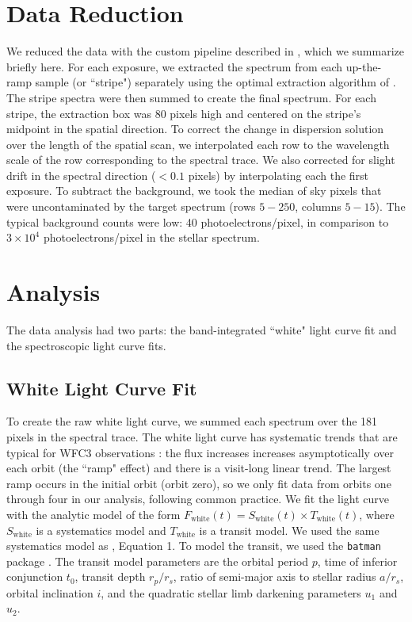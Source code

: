 \documentclass[twocolumn]{aastex61}
\begin{document}
\section{Data Reduction}
We reduced the data with the custom pipeline described in \cite{kreidberg14a}, which we summarize briefly here. For each exposure, we extracted the spectrum from each up-the-ramp sample (or ``stripe") separately using the optimal extraction algorithm of \citep{horne86}. The stripe spectra were then summed to create the final spectrum. For each stripe, the extraction box was 80 pixels high and centered on the stripe's midpoint in the spatial direction. To correct the change in dispersion solution over the length of the spatial scan, we interpolated each row to the wavelength scale of the row corresponding to the spectral trace. We also corrected for slight drift in the spectral direction ($<0.1$ pixels) by interpolating each the first exposure.  To subtract the background, we took the median of sky pixels that were uncontaminated by the target spectrum (rows $5-250$, columns $5-15$). The typical background counts were low: 40 photoelectrons/pixel, in comparison to $3\times10^4$ photoelectrons/pixel in the stellar spectrum.

\section{Analysis}
The data analysis had two parts: the band-integrated ``white" light curve fit and the spectroscopic light curve fits.

\subsection{White Light Curve Fit}
To create the raw white light curve, we summed each spectrum over the 181 pixels in the spectral trace.  The white light curve has systematic trends that are typical for WFC3 observations \cite{zhou17}: the flux increases increases asymptotically over each orbit (the ``ramp" effect) and there is a visit-long linear trend. The largest ramp occurs in the initial orbit (orbit zero), so we only fit data from orbits one through four in our analysis, following common practice.  We fit the light curve with the analytic model of the form $F_\mathrm{white}(t) = S_\mathrm{white}(t)\times T_\mathrm{white}(t)$, where $S_\mathrm{white}$ is a systematics model and $T_\mathrm{white}$ is a transit model. We used the same systematics model as \cite{kreidberg15b}, Equation 1.  To model the transit, we used the \texttt{batman} package \citep{kreidberg15a}.  The transit model parameters are the orbital period $p$, time of inferior conjunction $t_0$, transit depth $r_p/r_s$, ratio of semi-major axis to stellar radius $a/r_s$, orbital inclination $i$, and the quadratic stellar limb darkening parameters $u_1$ and $u_2$.
\end{document}
